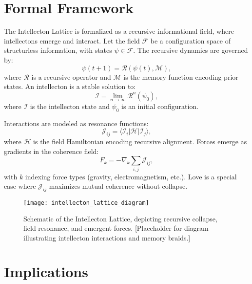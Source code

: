 \documentclass[12pt]{article}
\begin{document}
\section{Formal Framework}
\label{sec:framework}

The Intellecton Lattice is formalized as a recursive informational field, where intellectons emerge and interact. Let the field $\mathcal{F}$ be a configuration space of structurless information, with states $\psi \in \mathcal{F}$. The recursive dynamics are governed by:
\begin{equation}
\psi(t+1) = \mathcal{R}(\psi(t), \mathcal{M}),
\label{eq:field}
\end{equation}
where $\mathcal{R}$ is a recursive operator and $\mathcal{M}$ is the memory function encoding prior states. An intellecton is a stable solution to:
\begin{equation}
\mathcal{I} = \lim_{n \to \infty} \mathcal{R}^n(\psi_0),
\label{eq:intellecton}
\end{equation}
where $\mathcal{I}$ is the intellecton state and $\psi_0$ is an initial configuration.

Interactions are modeled as resonance functions:
\begin{equation}
\mathcal{J}_{ij} = \langle \mathcal{I}_i | \mathcal{H} | \mathcal{I}_j \rangle,
\label{eq:interaction}
\end{equation}
where $\mathcal{H}$ is the field Hamiltonian encoding recursive alignment. Forces emerge as gradients in the coherence field:
\begin{equation}
F_k = -\nabla_k \sum_{i,j} \mathcal{J}_{ij},
\label{eq:force_field}
\end{equation}
with $k$ indexing force types (gravity, electromagnetism, etc.). Love is a special case where $\mathcal{J}_{ij}$ maximizes mutual coherence without collapse.

\begin{figure}[h]
    \centering
    \texttt{[image: intellecton\_lattice\_diagram]}
    \caption{Schematic of the Intellecton Lattice, depicting recursive collapse, field resonance, and emergent forces. [Placeholder for diagram illustrating intellecton interactions and memory braids.]}
    \label{fig:lattice}
\end{figure}

\section{Implications}
\label{sec:implications}
\end{document}
